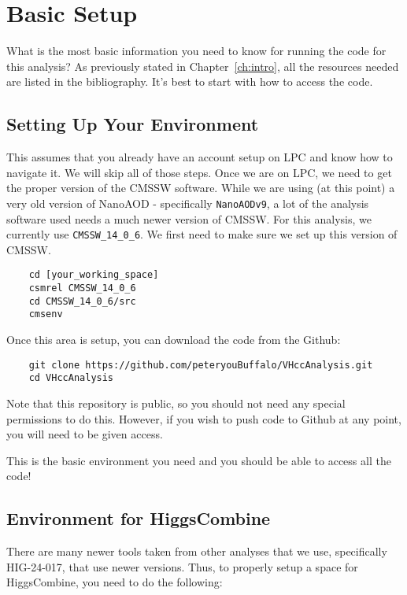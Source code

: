 \chapter{Basic Setup}\label{ch:basics}

What is the most basic information you need to know for running the code for this analysis? As previously stated in Chapter~\ref{ch:intro}, all the resources needed are listed in the bibliography. It's best to start with how to access the code.

\section{Setting Up Your Environment}\label{sec:setup}
This assumes that you already have an account setup on LPC and know how to navigate it. We will skip all of those steps. Once we are on LPC, we need to get the proper version of the CMSSW software. While we are using (at this point) a very old version of NanoAOD - specifically \verb|NanoAODv9|, a lot of the analysis software used needs a much newer version of CMSSW. For this analysis, we currently use \verb|CMSSW_14_0_6|. We first need to make sure we set up this version of CMSSW.

\begin{verbatim}
    cd [your_working_space]
    csmrel CMSSW_14_0_6
    cd CMSSW_14_0_6/src
    cmsenv
\end{verbatim}

\noindent Once this area is setup, you can download the code from the Github:

\begin{verbatim}
    git clone https://github.com/peteryouBuffalo/VHccAnalysis.git
    cd VHccAnalysis
\end{verbatim}

\noindent Note that this repository is public, so you should not need any special permissions to do this. However, if you wish to push code to Github at any point, you will need to be given access.

This is the basic environment you need and you should be able to access all the code!

\section{Environment for HiggsCombine}\label{sec:setup_combine}
There are many newer tools taken from other analyses that we use, specifically HIG-24-017, that use newer versions. Thus, to properly setup a space for HiggsCombine, you need to do the following:

